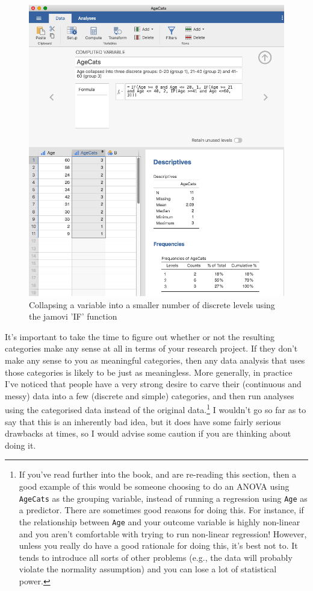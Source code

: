 \documentclass[
]{book}
\begin{document}
\begin{figure}

{\centering \includegraphics[width=1\linewidth]{img/mechanics/agecats} 

}

\caption{Collapsing a variable into a smaller number of discrete levels using the jamovi 'IF' function}\label{fig:agecats}
\end{figure}

It's important to take the time to figure out whether or not the resulting categories make any sense at all in terms of your research project. If they don't make any sense to you as meaningful categories, then any data analysis that uses those categories is likely to be just as meaningless. More generally, in practice I've noticed that people have a very strong desire to carve their (continuous and messy) data into a few (discrete and simple) categories, and then run analyses using the categorised data instead of the original data.\footnote{If you've read further into the book, and are re-reading this section, then a good example of this would be someone choosing to do an ANOVA using \texttt{AgeCats} as the grouping variable, instead of running a regression using \texttt{Age} as a predictor. There are sometimes good reasons for doing this. For instance, if the relationship between \texttt{Age} and your outcome variable is highly non-linear and you aren't comfortable with trying to run non-linear regression! However, unless you really do have a good rationale for doing this, it's best not to. It tends to introduce all sorts of other problems (e.g., the data will probably violate the normality assumption) and you can lose a lot of statistical power.} I wouldn't go so far as to say that this is an inherently bad idea, but it does have some fairly serious drawbacks at times, so I would advise some caution if you are thinking about doing it.
\end{document}
